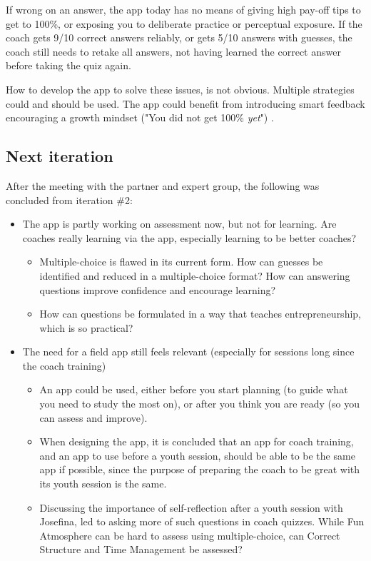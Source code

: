 If wrong on an answer, the app today has no means of giving high pay-off tips to get to 100\%, or exposing you to deliberate practice or perceptual exposure. If the coach gets 9/10 correct answers reliably, or gets 5/10 answers with guesses, the coach still needs to retake all answers, not having learned the correct answer before taking the quiz again.

How to develop the app to solve these issues, is not obvious. Multiple strategies could and should be used. The app could benefit from introducing smart feedback encouraging a growth mindset ("You did not get 100\% \textit{yet}") \cite{dweck}.

\subsection{Next iteration}
After the meeting with the partner and expert group, the following was concluded from iteration \#2:

\begin{itemize}
\item The app is partly working on assessment now, but not for learning. Are coaches really learning via the app, especially learning to be better coaches?
\begin{itemize}
  \item Multiple-choice is flawed in its current form. How can guesses be identified and reduced in a multiple-choice format? How can answering questions improve confidence and encourage learning?
  \item How can questions be formulated in a way that teaches entrepreneurship, which is so practical?
\end{itemize}
\item The need for a field app still feels relevant (especially for sessions long since the coach training)
  \begin{itemize}
  \item An app could be used, either before you start planning (to guide what you need to study the most on), or after you think you are ready (so you can assess and improve).
  \item When designing the app, it is concluded that an app for coach training, and an app to use before a youth session, should be able to be the same app if possible, since the purpose of preparing the coach to be great with its youth session is the same.
  \item Discussing the importance of self-reflection after a youth session with Josefina, led to asking more of such questions in coach quizzes. While Fun Atmosphere can be hard to assess using multiple-choice, can Correct Structure and Time Management be assessed?
  \end{itemize}
\end{itemize}

